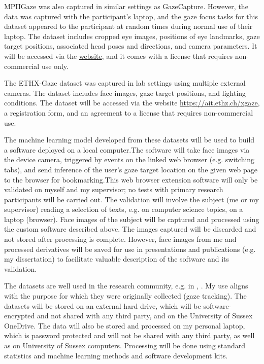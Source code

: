 \documentclass{report}
\begin{document}
MPIIGaze \cite{zhang15cvpr} was also captured in similar settings as GazeCapture. However, the data was captured with the participant's laptop, and the gaze focus tasks for this dataset appeared to the participant at random times during normal use of their laptop. The dataset includes cropped eye images, positions of eye landmarks, gaze target positions, associated head poses and directions, and camera parameters. It will be accessed via the \href{https://www.mpi-inf.mpg.de/departments/computer-vision-and-machine-learning/research/gaze-based-human-computer-interaction/appearance-based-gaze-estimation-in-the-wild/}{website}, and it comes with a license that requires non-commercial use only.

The ETHX-Gaze dataset \cite{zhang2020ethxgaze} was captured in lab settings using multiple external cameras. The dataset includes face images, gaze target positions, and lighting conditions. The dataset will be accessed via the website \url{https://ait.ethz.ch/xgaze}, a registration form, and an agreement to a license that requires non-commercial use.

The machine learning model developed from these datasets will be used to build a software deployed on a local computer.The software will take face images via the device camera, triggered by events on the linked web browser (e.g. switching tabs), and send inference of the user's gaze target location on the given web page to the browser for bookmarking.This web browser extension software will only be validated on myself and my supervisor; no tests with primary research participants will be carried out. The validation will involve the subject (me or my supervisor) reading a selection of texts, e.g. on computer science topics, on a laptop (browser). Face images of the subject will be captured and processed using the custom software described above. The images captured will be discarded and not stored after processing is complete. However, face images from me and processed derivatives will be saved for use in presentations and publications (e.g. my dissertation) to facilitate valuable description of the software and its validation.

The datasets are well used in the research community, e.g. in \cite{Valliappan2020accelerating}, \cite{seonwook2019fewshot} . My use aligns with the purpose for which they were originally collected (gaze tracking). The datasets will be stored on an external hard drive, which will be software-encrypted and not shared with any third party, and on the University of Sussex OneDrive. The data will also be stored and processed on my personal laptop, which is password protected and will not be shared with any third party, as well as on University of Sussex computers. Processing will be done using standard statistics and machine learning methods and software development kits.
\end{document}
